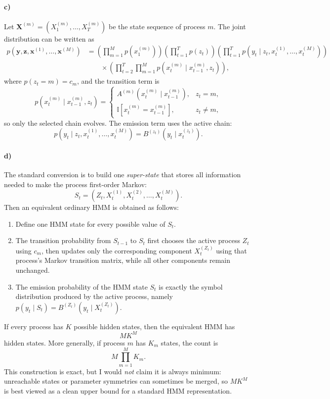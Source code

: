 \documentclass{article}
\begin{document}
\paragraph{c)} Let $\mathbf{X}^{(m)} = (X_1^{(m)},\ldots,X_T^{(m)})$ be the state sequence of process $m$. The joint distribution can be written as
\begin{align*}
p(\mathbf{y},\mathbf{z},\mathbf{x}^{(1)},\ldots,\mathbf{x}^{(M)})
&=
\left(\prod_{m=1}^{M} p(x_1^{(m)})\right)
\left(\prod_{t=1}^{T} p(z_t)\right)
\left(\prod_{t=1}^{T} p(y_t \mid z_t, x_t^{(1)},\ldots,x_t^{(M)})\right) \\
&\qquad \times
\left(\prod_{t=2}^{T} \prod_{m=1}^{M} p(x_t^{(m)} \mid x_{t-1}^{(m)}, z_t)\right),
\end{align*}
where $p(z_t=m)=c_m$, and the transition term is
\[
p(x_t^{(m)} \mid x_{t-1}^{(m)}, z_t)
=
\begin{cases}
A^{(m)}\!\left(x_t^{(m)} \mid x_{t-1}^{(m)}\right), & z_t=m,\\[4pt]
\mathbb{I}\!\left[x_t^{(m)} = x_{t-1}^{(m)}\right], & z_t\neq m,
\end{cases}
\]
so only the selected chain evolves. The emission term uses the active chain:
\[
p(y_t \mid z_t, x_t^{(1)},\ldots,x_t^{(M)})
=
B^{(z_t)}\!\left(y_t \mid x_t^{(z_t)}\right).
\]

\paragraph{d)} The standard conversion is to build one \emph{super-state} that stores all information needed to make the process first-order Markov:
\[
S_t = \left(Z_t, X_t^{(1)}, X_t^{(2)}, \ldots, X_t^{(M)}\right).
\]
Then an equivalent ordinary HMM is obtained as follows:
\begin{enumerate}
    \item Define one HMM state for every possible value of $S_t$.
    \item The transition probability from $S_{t-1}$ to $S_t$ first chooses the active process $Z_t$ using $c_m$, then updates only the corresponding component $X_t^{(Z_t)}$ using that process's Markov transition matrix, while all other components remain unchanged.
    \item The emission probability of the HMM state $S_t$ is exactly the symbol distribution produced by the active process, namely $p(y_t \mid S_t)=B^{(Z_t)}(y_t \mid X_t^{(Z_t)})$.
\end{enumerate}
If every process has $K$ possible hidden states, then the equivalent HMM has
\[
M K^M
\]
hidden states. More generally, if process $m$ has $K_m$ states, the count is
\[
M\prod_{m=1}^{M} K_m.
\]
This construction is exact, but I would \emph{not} claim it is always minimum: unreachable states or parameter symmetries can sometimes be merged, so $M K^M$ is best viewed as a clean upper bound for a standard HMM representation.
\end{document}
